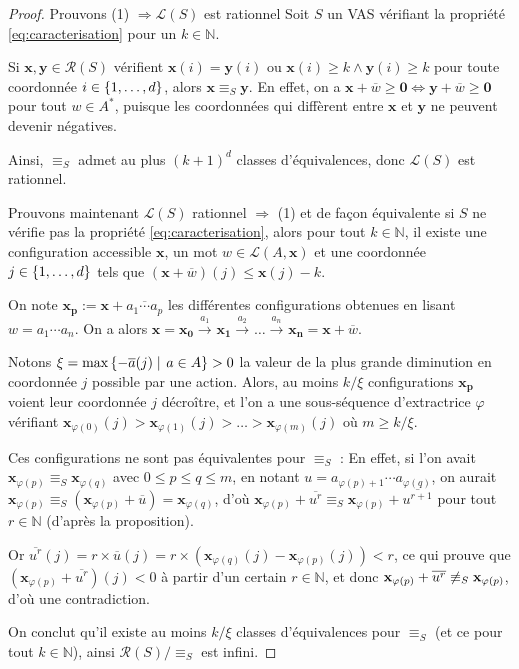\documentclass[a4paper,final]{article}
\theoremstyle{definition}
\let\phi\varphi
\let\leq\leqslant
\let\geq\geqslant
\newcommand{\set}[2]{\left\{#1\mathrel{\left|\vphantom{#1}\vphantom{#2}\right.}#2\right\}}
\newcommand{\os}[1]{\left\{\mathinner{#1}\right\}}
\newcommand{\N}{\ensuremath{\mathbb{N}}}
\newcommand{\lang}{\ensuremath{\mathcal{L}}}
\newcommand{\conf}{\ensuremath{\mathcal{R}}}
\newcommand{\trans}[2]{\ensuremath{\stackrel{#1}{\longrightarrow}_{#2}}}
\newcommand{\vect}[1]{\ensuremath{\mathbf{#1}}}
\newcommand{\rel}{\ensuremath{\equiv}}
\newcommand{\equivaut}{\ensuremath{\Leftrightarrow}}
\newcommand{\valeur}[1]{\ensuremath{\overline{#1}}}
\begin{document}
\begin{proof}
Prouvons (1) $\Rightarrow \lang(S)$ est rationnel
Soit $S$ un VAS vérifiant la propriété \eqref{eq:caracterisation} pour un $k\in\N$.

Si $\vect{x},\vect{y}\in\conf(S)$ vérifient 
$\vect{x}(i)=\vect{y}(i)$ ou $\vect{x}(i)\geq k \land \vect{y}(i)\geq k$
pour toute coordonnée $i\in\os{1,\dots,d}$, alors $\vect{x}\rel_S \vect{y}$. 
En effet, on a $\vect{x} +\valeur{w} \geq\vect{0} \equivaut \vect{y} +\valeur{w} \geq\vect{0}$ pour tout $w\in A^\ast$, 
puisque les coordonnées qui diffèrent entre $\vect{x}$ et $\vect{y}$ ne peuvent devenir négatives.

Ainsi, $\rel_S$ admet au plus $(k+1)^d$ classes d'équivalences, donc $\lang(S)$ est rationnel.

\vspace{2mm}\noindent
Prouvons maintenant $\lang(S)$ rationnel $\Rightarrow$ (1) et de façon équivalente
 si $S$ ne vérifie pas la propriété \eqref{eq:caracterisation}, alors
pour tout $k\in\N$, il existe une configuration accessible $\vect{x}$, un mot $w\in \lang(A,\vect{x})$ et une coordonnée $j\in\os{1,\dots,d}$ tels que $(\vect{x} +\valeur{w})(j)\leq \vect{x}(j)-k$.

On note $\vect{x_p}:=\vect{x} +\valeur{a_1\cdots a_p}$ les différentes configurations obtenues en lisant $w=a_1\cdots a_n$.
On a alors $\vect{x}=\vect{x_0} \trans{a_1}{}\vect{x_1} \trans{a_2}{}\dots \trans{a_n}{}\vect{x_n}= \vect{x} +\valeur{w}$.

Notons $\xi = \text{max}\set{-\valeur{a}(j)} {a\in A} >0$ la valeur de la plus grande diminution en coordonnée $j$ possible par une action.
Alors, au moins $k/\xi$ configurations $\vect{x_p}$ voient leur coordonnée $j$ décroître,
et l'on a une sous-séquence d'extractrice $\phi$ vérifiant $\vect{x}_{\phi(0)}(j)>\vect{x}_{\phi(1)}(j)>\dots>\vect{x}_{\phi(m)}(j)$ où $m\geq k/\xi$.

Ces configurations ne sont pas équivalentes pour $\rel_S$ :
En effet, si l'on avait $\vect{x}_{\phi(p)}\rel_S \vect{x}_{\phi(q)}$ avec $0\leq p\leq q\leq m$, en notant $u=a_{\phi(p)+1}\cdots a_{\phi(q)}$, 
on aurait $\vect{x}_{\phi(p)} \rel_S (\vect{x}_{\phi(p)} +\valeur{u}) =\vect{x}_{\phi(q)}$, d'où
$\vect{x}_{\phi(p)} +\valeur{u^r}\rel_S \vect{x}_{\phi(p)} +\valeur{u^{r+1}}$ pour tout $r\in\N$ (d'après la proposition).

Or $\valeur{u^r}(j) = r\times\valeur{u}(j) = r\times (\vect{x}_{\phi(q)}(j) -\vect{x}_{\phi(p)}(j)) <r$, 
ce qui prouve que $(\vect{x}_{\phi(p)} +\valeur{u^r})(j)<0$ à partir d'un certain $r\in\N$, 
et donc $\vect{x}_{\phi(p)} +\valeur{u^r} \not\rel_S \vect{x}_{\phi(p)}$, d'où une contradiction.

On conclut qu'il existe au moins $k/\xi$ classes d'équivalences pour $\rel_S$ (et ce pour tout $k\in\N$), 
ainsi $\conf(S)/\rel_S$ est infini.
\end{proof}
\end{document}
